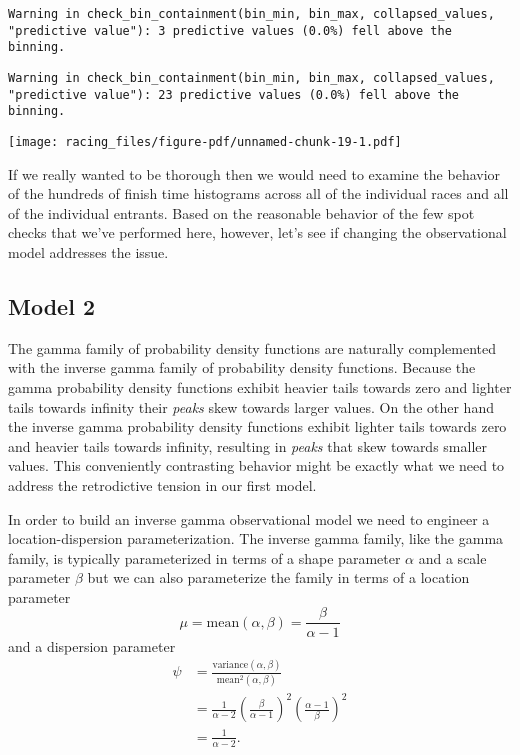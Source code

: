 \documentclass[
  letterpaper,
  DIV=11,
  numbers=noendperiod]{scrartcl}
\begin{document}
\begin{verbatim}
Warning in check_bin_containment(bin_min, bin_max, collapsed_values,
"predictive value"): 3 predictive values (0.0%) fell above the binning.
\end{verbatim}

\begin{verbatim}
Warning in check_bin_containment(bin_min, bin_max, collapsed_values,
"predictive value"): 23 predictive values (0.0%) fell above the binning.
\end{verbatim}

\texttt{[image: racing\_files/figure-pdf/unnamed-chunk-19-1.pdf]}

If we really wanted to be thorough then we would need to examine the
behavior of the hundreds of finish time histograms across all of the
individual races and all of the individual entrants. Based on the
reasonable behavior of the few spot checks that we've performed here,
however, let's see if changing the observational model addresses the
issue.

\subsection{Model 2}\label{model-2}

The gamma family of probability density functions are naturally
complemented with the inverse gamma family of probability density
functions. Because the gamma probability density functions exhibit
heavier tails towards zero and lighter tails towards infinity their
\emph{peaks} skew towards larger values. On the other hand the inverse
gamma probability density functions exhibit lighter tails towards zero
and heavier tails towards infinity, resulting in \emph{peaks} that skew
towards smaller values. This conveniently contrasting behavior might be
exactly what we need to address the retrodictive tension in our first
model.

In order to build an inverse gamma observational model we need to
engineer a location-dispersion parameterization. The inverse gamma
family, like the gamma family, is typically parameterized in terms of a
shape parameter \(\alpha\) and a scale parameter \(\beta\) but we can
also parameterize the family in terms of a location parameter \[
\mu = \text{mean}(\alpha, \beta) = \frac{\beta}{\alpha - 1}
\] and a dispersion parameter \begin{align*}
\psi
&=
\frac{ \text{variance}(\alpha, \beta) }{ \text{mean}^{2}(\alpha, \beta) }
\\
&=
\frac{1}{\alpha - 2} \left( \frac{ \beta }{ \alpha - 1} \right)^{2}
\left( \frac{ \alpha - 1 }{ \beta } \right)^{2}
\\
&=
\frac{1}{\alpha - 2}.
\end{align*}
\end{document}
